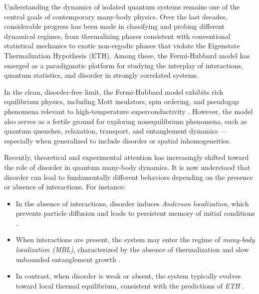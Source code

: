 

Understanding the dynamics of isolated quantum systems remains one of the central goals of contemporary many-body physics. Over the last decades, considerable progress has been made in classifying and probing different dynamical regimes, from thermalizing phases consistent with conventional statistical mechanics to exotic non-ergodic phases that violate the Eigenstate Thermalization Hypothesis (ETH). Among these, the Fermi-Hubbard model has emerged as a paradigmatic platform for studying the interplay of interactions, quantum statistics, and disorder in strongly correlated systems.

In the clean, disorder-free limit, the Fermi-Hubbard model exhibits rich equilibrium physics, including Mott insulators, spin ordering, and pseudogap phenomena relevant to high-temperature superconductivity \cite{esslinger_fermi-hubbard_2010}. However, the model also serves as a fertile ground for exploring nonequilibrium phenomena, such as quantum quenches, relaxation, transport, and entanglement dynamics — especially when generalized to include disorder or spatial inhomogeneities.

Recently, theoretical and experimental attention has increasingly shifted toward the role of disorder in quantum many-body dynamics. It is now understood that disorder can lead to fundamentally different behaviors depending on the presence or absence of interactions. For instance:
\begin{itemize}
	\item In the absence of interactions, disorder induces \textit{Anderson localization}, which prevents particle diffusion and leads to persistent memory of initial conditions \cite{anderson_absence_1958}.
	\item When interactions are present, the system may enter the regime of \textit{many-body localization (MBL)}, characterized by the absence of thermalization and slow unbounded entanglement growth \cite{basko_metalinsulator_2006,nandkishore_many-body_2015}.
	\item In contrast, when disorder is weak or absent, the system typically evolves toward local thermal equilibrium, consistent with the predictions of \textit{ETH} \cite{deutsch_quantum_1991,srednicki_chaos_1994}. 
\end{itemize}

